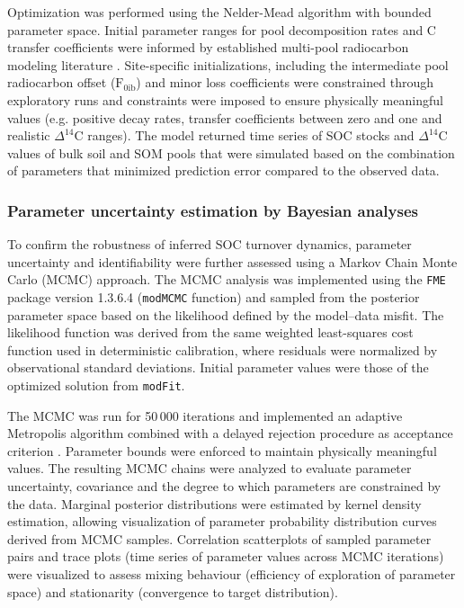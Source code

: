 \documentclass[bg, manuscript]{copernicus}
\begin{document}
Optimization was performed using the Nelder-Mead algorithm with bounded parameter space. Initial parameter ranges for pool decomposition rates and C transfer coefficients were informed by established multi-pool radiocarbon modeling literature \citep{Gaudinski2000, Manzoni2009, Jenkinson1990, Parton1987}. Site-specific initializations, including the intermediate pool radiocarbon offset ($\text{F}_{0\text{ib}}$) and minor loss coefficients were constrained through exploratory runs and constraints were imposed to ensure physically meaningful values (e.g. positive decay rates, transfer coefficients between zero and one and realistic $\Delta^{14}\text{C}$ ranges). The model returned time series of SOC stocks and $\Delta^{14}\text{C}$ values of bulk soil and SOM pools that were simulated based on the combination of parameters that minimized prediction error compared to the observed data.

\subsubsection{Parameter uncertainty estimation by Bayesian analyses}
To confirm the robustness of inferred SOC turnover dynamics, parameter uncertainty and identifiability were further assessed using a Markov Chain Monte Carlo (MCMC) approach. The MCMC analysis was implemented using the \texttt{FME} package version 1.3.6.4 (\texttt{modMCMC} function) and sampled from the posterior parameter space based on the likelihood defined by the model--data misfit. The likelihood function was derived from the same weighted least-squares cost function used in deterministic calibration, where residuals were normalized by observational standard deviations. Initial parameter values were those of the optimized solution from \texttt{modFit}.

The MCMC was run for 50\,000 iterations and implemented an adaptive Metropolis algorithm combined with a delayed rejection procedure as acceptance criterion \citep{MarkoLaine2008}. Parameter bounds were enforced to maintain physically meaningful values. The resulting MCMC chains were analyzed to evaluate parameter uncertainty, covariance and the degree to which parameters are constrained by the data. Marginal posterior distributions were estimated by kernel density estimation, allowing visualization of parameter probability distribution curves derived from MCMC samples. Correlation scatterplots of sampled parameter pairs and trace plots (time series of parameter values across MCMC iterations) were visualized to assess mixing behaviour (efficiency of exploration of parameter space) and stationarity (convergence to target distribution).
\end{document}
